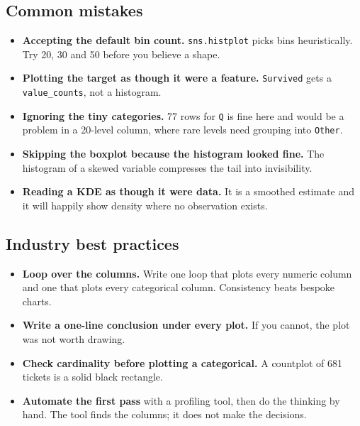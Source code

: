 \documentclass[11pt,a4paper]{article}
\begin{document}

\subsection*{Common mistakes}

\begin{itemize}\itemsep3pt
  \item \textbf{Accepting the default bin count.} \lstinline|sns.histplot| picks bins
        heuristically. Try 20, 30 and 50 before you believe a shape.
  \item \textbf{Plotting the target as though it were a feature.} \texttt{Survived} gets a
        \lstinline|value_counts|, not a histogram.
  \item \textbf{Ignoring the tiny categories.} 77 rows for \texttt{Q} is fine here and would
        be a problem in a 20-level column, where rare levels need grouping into
        \texttt{Other}.
  \item \textbf{Skipping the boxplot because the histogram looked fine.} The histogram of a
        skewed variable compresses the tail into invisibility.
  \item \textbf{Reading a KDE as though it were data.} It is a smoothed estimate and it will
        happily show density where no observation exists.
\end{itemize}

\subsection*{Industry best practices}

\begin{itemize}\itemsep3pt
  \item \textbf{Loop over the columns.} Write one loop that plots every numeric column and
        one that plots every categorical column. Consistency beats bespoke charts.
  \item \textbf{Write a one-line conclusion under every plot.} If you cannot, the plot was
        not worth drawing.
  \item \textbf{Check cardinality before plotting a categorical.} A countplot of 681
        tickets is a solid black rectangle.
  \item \textbf{Automate the first pass} with a profiling tool, then do the thinking by
        hand. The tool finds the columns; it does not make the decisions.
\end{itemize}
\end{document}
